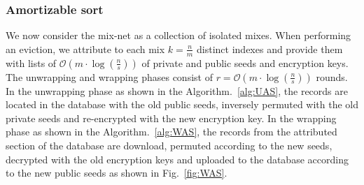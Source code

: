 \documentclass{llncs}
\begin{document}
\subsubsection{Amortizable sort}
%
We now consider the mix-net as a collection of isolated mixes. When performing an eviction, we attribute to each mix  $k=\frac{n}{m}$ distinct indexes and provide them with lists of $\mathcal{O}\left ( m \cdot \log \left (\frac{n}{s} \right ) \right )$ of private and public seeds and encryption keys.\\
The unwrapping and wrapping phases consist of $r=\mathcal{O}\left ( m \cdot \log \left (\frac{n}{s} \right ) \right )$ rounds.
In the unwrapping phase as shown in the Algorithm.~\ref{alg:UAS}, the records are located in the database with the old public seeds, inversely permuted with the old private seeds and re-encrypted with the new encryption key. 
In the wrapping phase as shown in the Algorithm.~\ref{alg:WAS}, the records from the attributed section of the database are download, permuted according to the new seeds, decrypted with the old encryption keys and uploaded to the database according to the new public seeds as shown in Fig.~\ref{fig:WAS}.\\
\end{document}
